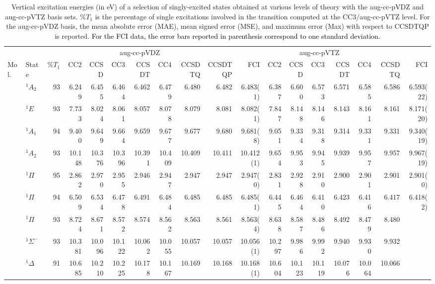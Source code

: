 \documentclass[aip,jcp,reprint,noshowkeys,superscriptaddress]{revtex4-1}
\newcommand{\alert}[1]{\textcolor{black}{#1}}
\newcommand{\mc}{\multicolumn}
\begin{document}
\begin{squeezetable}
\begin{table}
	\caption{Vertical excitation energies (in eV) of a selection of singly-excited states obtained at various levels of theory with the aug-cc-pVDZ and aug-cc-pVTZ basis sets. 
	$\%T_1$ is the percentage of single excitations involved in the transition computed at the CC3/aug-cc-pVTZ level.
	For the aug-cc-pVDZ basis, the mean absolute error (MAE), mean signed error (MSE), and maximum error (Max) with respect to CCSDTQP is reported.
	\alert{For the FCI data, the error bars reported in parenthesis correspond to one standard deviation.}
	\label{tab:singles}}
	\begin{ruledtabular}
	\begin{tabular}{llrrrrrrrrrrrrrrrr}
				&		&	\mc{8}{c}{aug-cc-pVDZ}		&		\mc{7}{c}{aug-cc-pVTZ}		\\	
				\cline{4-11} \cline{12-18}
	Mol.	&	State	& $\%T_1$	&CC2	&CCSD	&CC3	&CCSDT	&CC4	&CCSDTQ	&CCSDTQP	&FCI	
									&CC2	&CCSD	&CC3	&CCSDT	&CC4	&CCSDTQ	&FCI			\\
	\hline
	\ce{NH3}	&	$^1A_2$ 		&93	&6.249	&6.455	&6.464	&6.462	&6.479	&6.480	&6.482	&6.483(1)	&6.387	&6.600	&6.573	&6.571	&6.585	&6.586	&6.593(22)	\\	
				&	$^1E$			&93	&7.733	&8.024	&8.061	&8.057	&8.078	&8.079	&8.081	&8.082(1)	&7.847	&8.148	&8.146	&8.143	&8.161	&8.161	&8.171(20)	\\	
				&	$^1A_1$ 		&94	&9.400	&9.649	&9.664	&9.659	&9.677	&9.677	&9.680	&9.681(8)	&9.051	&9.334	&9.318	&9.314	&9.331	&9.331	&9.340(19)	\\
				&	$^1A_2$ 		&93	&10.148	&10.376	&10.396	&10.391	&10.409	&10.409	&10.411	&10.412(1)	&9.654	&9.953	&9.945	&9.939	&9.957	&9.957	&9.967(19)	\\
	\ce{BH}		&	$^1\Pi$ 		&95	&2.862	&2.970	&2.955	&2.946	&2.947	&2.947	&2.947	&2.947(0)	&2.831	&2.928	&2.910	&2.900	&2.901	&2.901	&2.901(0)	\\
	\ce{BF}		&	$^1\Pi$ 		&94	&6.509	&6.534	&6.478	&6.491	&6.484	&6.485	&6.485	&6.485(1)	&6.445	&6.464	&6.410	&6.423	&6.416	&6.417	&6.418(2)\\
	\ce{CO}		&	$^1\Pi$ 		&93	&8.724	&8.671	&8.572	&8.574	&8.562	&8.563	&8.561	&8.563(4)	&8.638	&8.587	&8.486	&8.492	&8.479	&8.480	&	\\
				&	$^1\Sigma^-$ 	&93	&10.381	&10.096	&10.122	&10.062	&10.055	&10.057	&10.057	&10.056(1)	&10.297	&9.986	&9.992	&9.940	&9.930	&9.932	&	\\
				&	$^1\Delta$ 		&91	&10.685	&10.210	&10.225	&10.178	&10.167	&10.169	&10.168	&10.168(1)	&10.604	&10.123	&10.119	&10.076	&10.064	&10.066	&	\\

\end{tabular}
\end{ruledtabular}
\end{table}
\end{squeezetable}
\end{document}
